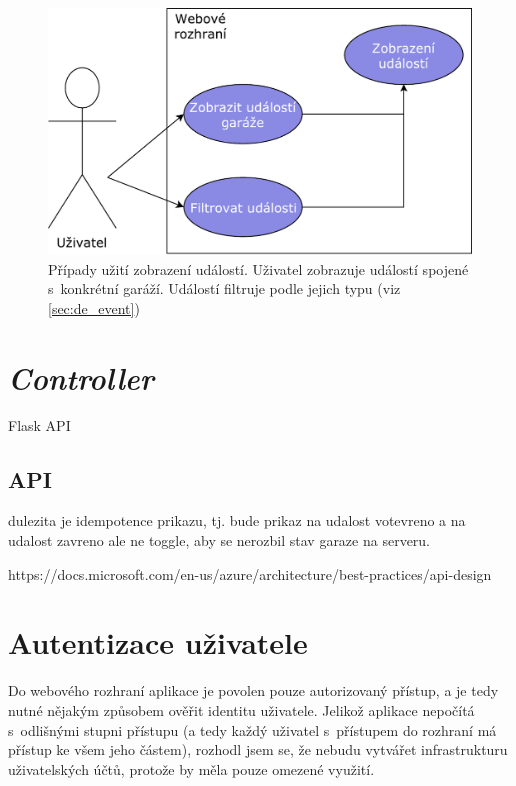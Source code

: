 \begin{figure}[h!]
    \centering
    \includegraphics[width=\textwidth]{images/use_case_events.pdf}
    \caption[Případy užití zobrazení událostí]{Případy užití zobrazení událostí. Uživatel zobrazuje událostí spojené s~konkrétní garáží. Událostí filtruje podle jejich typu (viz \ref{sec:de_event})}
    \label{fig:use_case_events}
\end{figure}

\section{\textit{Controller}}

Flask API

\subsection{API}
\label{sec:de_api}

dulezita je idempotence prikazu, tj. bude prikaz na udalost votevreno a na udalost zavreno ale ne toggle, aby se nerozbil stav garaze na serveru.

https://docs.microsoft.com/en-us/azure/architecture/best-practices/api-design

\section{Autentizace uživatele}
\label{sec:de_auth}

Do webového rozhraní aplikace je povolen pouze autorizovaný přístup, a je tedy nutné nějakým způsobem ověřit identitu uživatele. Jelikož aplikace nepočítá s~odlišnými stupni přístupu (a tedy každý uživatel s~přístupem do rozhraní má přístup ke všem jeho částem), rozhodl jsem se, že nebudu vytvářet infrastrukturu uživatelských účtů, protože by měla pouze omezené využití.


